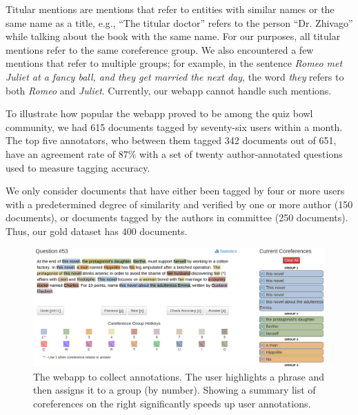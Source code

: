 Titular mentions are mentions that refer to entities with similar names or the
same name as a title, e.g., ``The titular doctor'' refers to the person
``Dr. Zhivago'' while talking about the book with the same name. For our purposes, all titular mentions refer to the same coreference group. We also encountered a few mentions that refer to multiple groups; for example, in the sentence \emph{Romeo met Juliet at a fancy ball, and they get married the next day}, the word \emph{they} refers to both \emph{Romeo} and \emph{Juliet}. Currently, our webapp cannot handle such mentions.

To illustrate how popular the webapp proved to be among the quiz bowl community,
we had 615 documents tagged by seventy-six users within a month.  The top five
annotators, who between them tagged 342 documents out of 651, have an agreement
rate of 87\% with a set of twenty author-annotated questions used to measure
tagging accuracy.

We only consider documents that have either been tagged by four or more users with
a predetermined degree of similarity and verified by one or more
author (150 documents), or documents tagged
by the authors in committee (250 documents). Thus,
our gold dataset has 400 documents.

\begin{figure}[t!]
  \centering
  \includegraphics[scale=0.31]{2015_naacl_qb_coref/figures/webapp.png}
  \caption{The webapp to collect annotations. The user highlights
    a phrase and then assigns it to a group (by number).
    Showing a summary list of coreferences on the right significantly speeds up user
    annotations.}
  \label{fig:screenshot}
\end{figure}

